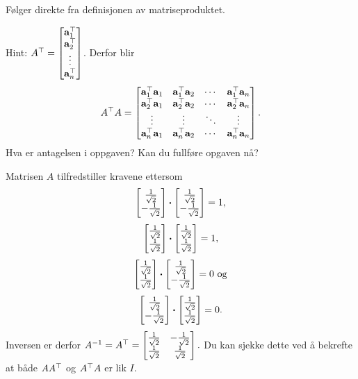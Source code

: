 \begin{losning}

\begin{punkt}
Følger direkte fra definisjonen av matriseproduktet.
\end{punkt}


\begin{punkt}
Hint: $A^\top=\begin{bmatrix}
\mathbf{a}_1^\top\\
\mathbf{a}_2^\top\\
\vdots\\
\mathbf{a}_n^\top
\end{bmatrix}$. Derfor blir
$$A^\top A=\begin{bmatrix}
\mathbf{a}_1^\top \mathbf{a}_1 & \mathbf{a}_1^\top \mathbf{a}_2 & \cdots & \mathbf{a}_1^\top\mathbf{a}_n\\
\mathbf{a}_2^\top \mathbf{a}_1 & \mathbf{a}_2^\top \mathbf{a}_2 & \cdots & \mathbf{a}_2^\top\mathbf{a}_n\\
\vdots & \vdots & \ddots & \vdots\\
\mathbf{a}_n^\top \mathbf{a}_1 & \mathbf{a}_n^\top \mathbf{a}_2 & \cdots & \mathbf{a}_n^\top\mathbf{a}_n
\end{bmatrix}.
$$ Hva er antagelsen i oppgaven? Kan du fullføre opgaven nå?

\end{punkt}


\begin{punkt}
Matrisen $A$ tilfredstiller kravene ettersom $$\begin{bmatrix} \frac{1}{\sqrt{2}} \\ -\frac{1}{\sqrt{2}} \end{bmatrix}\boldsymbol{\cdot} \begin{bmatrix} \frac{1}{\sqrt{2}} \\ -\frac{1}{\sqrt{2}} \end{bmatrix}=1,$$ $$\begin{bmatrix} \frac{1}{\sqrt{2}} \\ \frac{1}{\sqrt{2}} \end{bmatrix}\boldsymbol{\cdot}  \begin{bmatrix} \frac{1}{\sqrt{2}} \\ \frac{1}{\sqrt{2}} \end{bmatrix}=1,$$ $$\begin{bmatrix} \frac{1}{\sqrt{2}} \\ \frac{1}{\sqrt{2}} \end{bmatrix}\boldsymbol{\cdot}  \begin{bmatrix} \frac{1}{\sqrt{2}} \\ -\frac{1}{\sqrt{2}} \end{bmatrix}=0 \text{ og}$$ $$\begin{bmatrix} \frac{1}{\sqrt{2}} \\ -\frac{1}{\sqrt{2}} \end{bmatrix}\boldsymbol{\cdot}  \begin{bmatrix} \frac{1}{\sqrt{2}} \\ \frac{1}{\sqrt{2}} \end{bmatrix}=0.$$ Inversen er derfor $A^{-1}=A^\top=\begin{bmatrix}
\frac{1}{\sqrt{2}} & -\frac{1}{\sqrt{2}}\\
\frac{1}{\sqrt{2}} & \frac{1}{\sqrt{2}}
\end{bmatrix}.$ Du kan sjekke dette ved å bekrefte at både $AA^\top$ og $A^\top A$ er lik $I$.
\end{punkt}


\end{losning}



